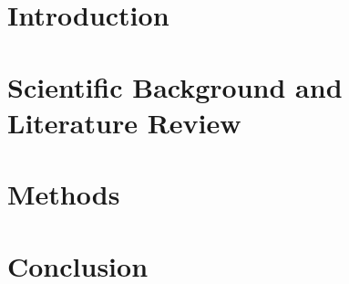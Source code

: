\documentclass[a4paper]{ustthesis}
\begin{document}


\chapter{Introduction}
\label{chp_intro}

\newpage

% 



\chapter{Scientific Background and Literature Review}
\label{chp_review}

\newpage

\chapter{Methods}
\label{chp_attack}

\newpage


\chapter{Conclusion}
\label{chp_conclusion}

\newpage
\end{document}
